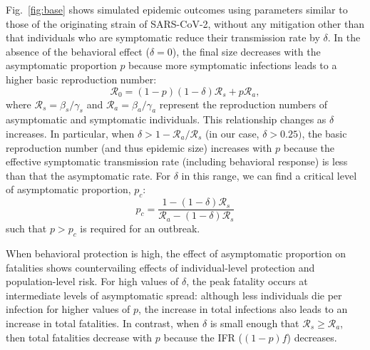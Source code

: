 \documentclass[12pt]{article}
\newcommand{\fref}[1]{Fig.~\ref{fig:#1}}
\newcommand{\RR}{\ensuremath{{\mathcal R}}\xspace}
\begin{document}
\fref{base} shows simulated epidemic outcomes using parameters similar to those of the originating strain of SARS-CoV-2, without any mitigation other than that individuals who are symptomatic reduce their transmission rate by $\delta$. 
In the absence of the behavioral effect ($\delta=0$), the final size decreases with the asymptomatic proportion $p$ because more symptomatic infections leads to a higher basic reproduction number:
\begin{equation}
\RR_0 = (1-p) (1-\delta) \RR_s + p \RR_a,
\end{equation}
where $\RR_s = \beta_s/\gamma_s$ and $\RR_a = \beta_a/\gamma_a$ represent the reproduction numbers of asymptomatic and symptomatic individuals.
This relationship changes as $\delta$ increases.
In particular, when $\delta > 1-\RR_a/\RR_s$ (in our case, $\delta > 0.25)$, the basic reproduction number (and thus epidemic size) increases with $p$ because the effective symptomatic transmission rate (including behavioral response) is less than that the asymptomatic rate.
For $\delta$ in this range, we can find a critical level of asymptomatic proportion, $p_c$:
\begin{equation}
    p_c = \frac{1 - (1-\delta) \RR_s}{\RR_a - (1-\delta) \RR_s}
\end{equation}
such that $p>p_c$ is required for an outbreak.

When behavioral protection is high, the effect of asymptomatic proportion on fatalities shows countervailing effects of individual-level protection and population-level risk.
For high values of $\delta$, the peak fatality occurs at intermediate levels of asymptomatic spread:
although less individuals die per infection for higher values of $p$, the increase in total infections also leads to an increase in total fatalities.
In contrast, when $\delta$ is small enough that $\RR_s\geq\RR_a$, then total fatalities decrease with $p$ because the IFR ($(1-p)f$) decreases.
\end{document}
